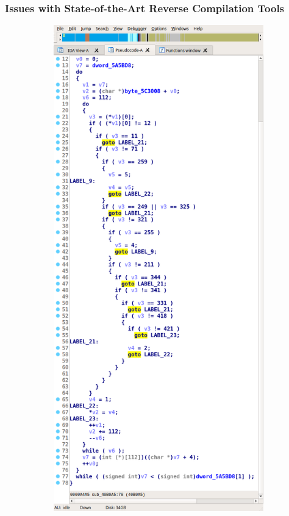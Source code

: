 \documentclass[aspectratio=1610]{beamer}
\begin{document}
\begin{frame}
	\frametitle{Issues with State-of-the-Art Reverse Compilation Tools}

	\begin{figure}[htbp]
		\centering
		\begin{subfigure}[ht]{0.30\textwidth}
			\centering
			\includegraphics[height=0.80\textheight]{inc/applications/ida/ida_40B0A5.png}

\end{subfigure}
\end{figure}
\end{frame}
\end{document}
